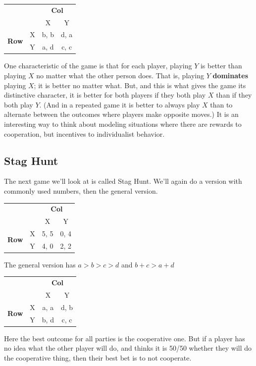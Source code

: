 \documentclass[openany]{book}
\begin{document}
\begin{center}
\begin{tabular}{l r | c c}
 & & \multicolumn{2}{c}{\textbf{Col}} \\
& & X & Y \\ \hline
\multirow{2}{*}{\textbf{Row}} & X & b, b & d, a \\ & Y & a, d & c, c \\
\end{tabular}
\end{center}
One characteristic of the game is that for each player, playing $Y$ is better than playing $X$ no matter what the other person does. That is, playing $Y$ \textbf{dominates} playing $X$; it is better no matter what. But, and this is what gives the game its distinctive character, it is better for both players if they both play $X$ than if they both play $Y$. (And in a repeated game it is better to always play $X$ than to alternate between the outcomes where players make opposite moves.) It is an interesting way to think about modeling situations where there are rewards to cooperation, but incentives to individualist behavior.

\subsection{Stag Hunt}
The next game we'll look at is called Stag Hunt. We'll again do a version with commonly used numbers, then the general version.
\begin{center}
\begin{tabular}{l r | c c}
 & & \multicolumn{2}{c}{\textbf{Col}} \\
& & X & Y \\ \hline
\multirow{2}{*}{\textbf{Row}} & X & 5, 5 & 0, 4 \\ & Y & 4, 0 & 2, 2 \\
\end{tabular}
\end{center}
The general version has $a > b > c > d$ and $b + c > a + d$
\begin{center}
\begin{tabular}{l r | c c}
 & & \multicolumn{2}{c}{\textbf{Col}} \\
& & X & Y \\ \hline
\multirow{2}{*}{\textbf{Row}} & X & a, a & d, b \\ & Y & b, d & c, c \\
\end{tabular}
\end{center}
Here the best outcome for all parties is the cooperative one. But if a player has no idea what the other player will do, and thinks it is 50/50 whether they will do the cooperative thing, then their best bet is to not cooperate.
\end{document}
